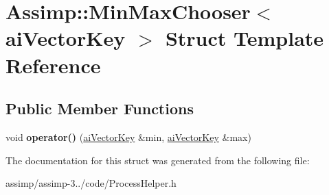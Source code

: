 \hypertarget{struct_assimp_1_1_min_max_chooser_3_01ai_vector_key_01_4}{\section{Assimp\+:\+:Min\+Max\+Chooser$<$ ai\+Vector\+Key $>$ Struct Template Reference}
\label{struct_assimp_1_1_min_max_chooser_3_01ai_vector_key_01_4}
}
\subsection*{Public Member Functions}
\begin{DoxyCompactItemize}
\item 
\hypertarget{struct_assimp_1_1_min_max_chooser_3_01ai_vector_key_01_4_a389afca70f68df3f2c04ee4d54c2a797}{void {\bfseries operator()} (\hyperlink{structai_vector_key}{ai\+Vector\+Key} \&min, \hyperlink{structai_vector_key}{ai\+Vector\+Key} \&max)}\label{struct_assimp_1_1_min_max_chooser_3_01ai_vector_key_01_4_a389afca70f68df3f2c04ee4d54c2a797}

\end{DoxyCompactItemize}


The documentation for this struct was generated from the following file\+:\begin{DoxyCompactItemize}
\item 
assimp/assimp-\/3../code/Process\+Helper.\+h\end{DoxyCompactItemize}
